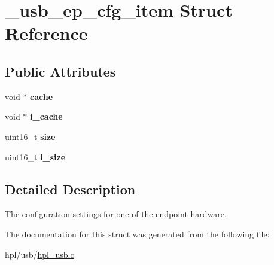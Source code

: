 \hypertarget{struct__usb__ep__cfg__item}{}\section{\+\_\+usb\+\_\+ep\+\_\+cfg\+\_\+item Struct Reference}
\label{struct__usb__ep__cfg__item}
\subsection*{Public Attributes}
\begin{DoxyCompactItemize}
\item 
\mbox{\label{struct__usb__ep__cfg__item_ad5e0c2135617476e0f337d72d1881868}} 
void $\ast$ {\bfseries cache}
\item 
\mbox{\label{struct__usb__ep__cfg__item_ac622388183bc316e730283403969a7a2}} 
void $\ast$ {\bfseries i\+\_\+cache}
\item 
\mbox{\label{struct__usb__ep__cfg__item_af8c7f0c418ee29b1fb08f87a16001165}} 
uint16\+\_\+t {\bfseries size}
\item 
\mbox{\label{struct__usb__ep__cfg__item_ae23816a1616f1ae44bfa36ce27f94b9c}} 
uint16\+\_\+t {\bfseries i\+\_\+size}
\end{DoxyCompactItemize}


\subsection{Detailed Description}
The configuration settings for one of the endpoint hardware. 

The documentation for this struct was generated from the following file\+:\begin{DoxyCompactItemize}
\item 
hpl/usb/\hyperlink{hpl__usb_8c}{hpl\+\_\+usb.\+c}\end{DoxyCompactItemize}
